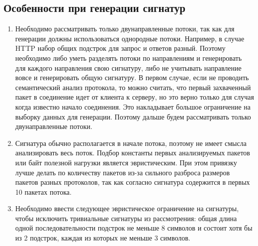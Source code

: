 \subsection{Особенности при генерации сигнатур}

\begin{enumerate}
    \item
    Необходимо рассматривать только двунаправленные потоки, так как для генерации должны использоваться однородные потоки.
    Например, в случае HTTP набор общих подстрок для запрос и ответов разный.
    Поэтому необходимо либо уметь разделять потоки по направлениям и генерировать для каждого направления свою сигнатуру,
    либо не учитывать направление вовсе и генерировать общую сигнатуру.
    В первом случае, если не проводить семантический анализ протокола, то можно считать, что первый захваченный пакет
    в соединение идет от клиента к серверу, но это верно только для случая когда известно начало соединения.
    Это накладывает большое ограничение на выборку данных для генерации.
    Поэтому дальше будем рассматривать только двунаправленные потоки.

    \item
    Сигнатура обычно располагается в начале потока, поэтому не имеет смысла анализировать весь поток.
    Подбор константы первых анализируемых пакетов или байт полезной нагрузки является эвристическим.
    При этом привязку лучше делать по количеству пакетов из-за сильного разброса размеров пакетов разных протоколов,
    так как согласно \cite{park2008towards} сигнатура содержится в первых 10 пакетах потока.

    \item
    Необходимо ввести следующее эвристическое ограничение на сигнатуры, чтобы исключить тривиальные сигнатуры из рассмотрения:
    общая длина одной последовательности подстрок не меньше 8 символов
    и состоит хотя бы из 2 подстрок, каждая из которых не меньше 3 символов.


\end{enumerate}
